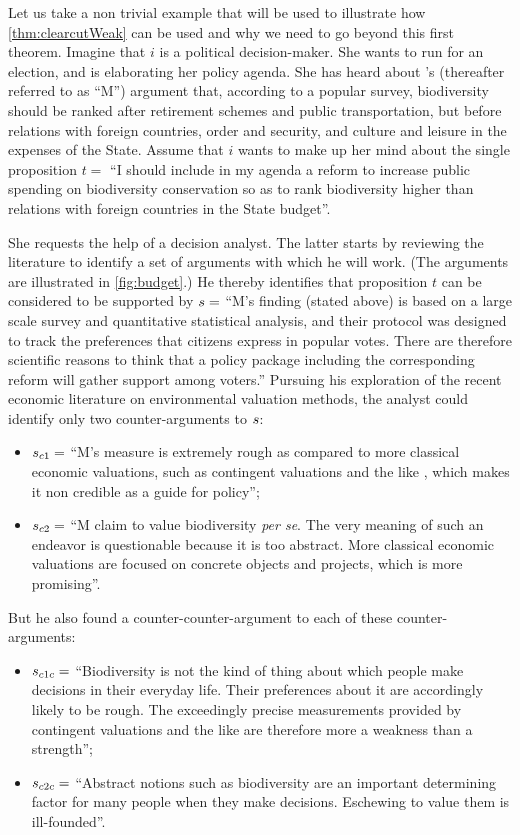 \documentclass[version=3.21, pagesize, twoside=off, bibliography=totoc, DIV=calc, fontsize=12pt, a4paper]{scrartcl}
\begin{document}
\begin{example}
\label{ex:budget}
Let us take a non trivial example that will be used to illustrate how \cref{thm:clearcutWeak} can be used and why we need to go beyond this first theorem. Imagine that $i$ is a political decision-maker. She wants to run for an election, and is elaborating her policy agenda. She has heard about  \citeauthor{meinard_measuring_2017}'s \citeyearpar{meinard_measuring_2017} (thereafter referred to as “M”) argument that, according to a popular survey, biodiversity should be ranked after retirement schemes and public transportation, but before relations with foreign countries, order and security, and culture and leisure in the expenses of the State. Assume that $i$ wants to make up her mind about the single proposition $t =$ “I should include in my agenda a reform to increase public spending on biodiversity conservation so as to rank biodiversity higher than relations with foreign countries in the State budget”.

She requests the help of a decision analyst. The latter starts by reviewing the literature to identify a set of arguments with which he will work. (The arguments are illustrated in \cref{fig:budget}.) He thereby identifies that proposition $t$ can be considered to be supported by $s =$ “M's finding (stated above) is based on a large scale survey and quantitative statistical analysis, and their protocol was designed to track the preferences that citizens express in popular votes. There are therefore scientific reasons to think that a policy package including the corresponding reform will gather support among voters.” Pursuing his exploration of the recent economic literature on environmental valuation methods, the analyst could identify only two counter-arguments to $s$:
\begin{itemize}
	\item $s_{c1}=$ “M's measure is extremely rough as compared to more classical economic valuations, such as contingent valuations and the like \citep{kontoleon_biodiversity_2007}, which makes it non credible as a guide for policy”;
	\item $s_{c2}=$ “M claim to value biodiversity \emph{per se}. The very meaning of such an endeavor is questionable because it is too abstract. More classical economic valuations are focused on concrete objects and projects, which is more promising”.
\end{itemize}

But he also found a counter-counter-argument to each of these counter-arguments:
\begin{itemize}
	\item $s_{c1c}=$ “Biodiversity is not the kind of thing about which people make decisions in their everyday life. Their preferences about it are accordingly likely to be rough. The exceedingly precise measurements provided by contingent valuations and the like are therefore more a weakness than a strength”;
	\item $s_{c2c}=$ “Abstract notions such as biodiversity are an important determining factor for many people when they make decisions. Eschewing to value them is ill-founded”.
\end{itemize}


\end{example}
\end{document}
